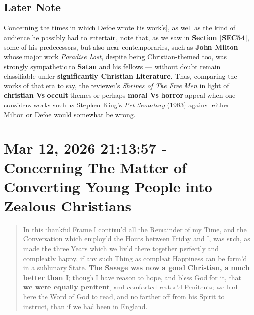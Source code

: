 \documentclass[a4paper]{article}
\begin{document}
\subsection{Later Note}


Concerning the times in which Defoe wrote his work[s], as well as the kind of audience he possibly had to entertain, note that, as we saw in \textbf{\hyperref[SEC54]{Section \ref{SEC54}}}, some of his predecessors, but also near-contemporaries, such as \textbf{John Milton} --- whose major work \textit{Paradise Lost}, despite being Christian-themed too, was strongly sympathetic to \textbf{Satan} and his fellows --- without doubt remain classifiable under \textbf{significantly Christian Literature}. Thus, comparing the works of that era to say, the reviewer's \textit{Shrines of The Free Men}\cite{shrinesjwl} in light of \textbf{christian Vs occult} themes or perhaps \textbf{moral Vs horror} appeal when one considers works such as Stephen King's \textit{Pet Sematary} (1983) against either Milton or Defoe would somewhat be wrong.






\section{Mar 12, 2026 21:13:57 - Concerning The Matter of Converting Young People into Zealous Christians}
\label{SEC58}


\noindent
\begin{minipage}{1\textwidth}
\vspace{1em}
\begin{quotation}
{\ttfamily


In this thankful Frame I continu’d all the Remainder of my Time, and the Conversation which employ’d the Hours between Friday and I, was such, as made the three Years which we liv’d there together perfectly and compleatly happy, if any such Thing as compleat Happiness can be form’d in a sublunary State. \textbf{The Savage was now a good Christian, a much better than I}; though I have reason to hope, and bless God for it, that \textbf{we were equally penitent}, and comforted restor’d Penitents; we had here the Word of God to read, and no farther off from his Spirit to instruct, than if we had been in England.


}
\end{quotation}
\vspace{1em}
\end{minipage}
\end{document}
